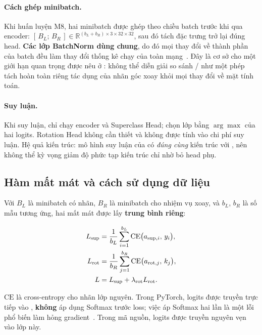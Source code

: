 \paragraph{Cách ghép minibatch.}
Khi huấn luyện M8, hai minibatch được ghép theo chiều batch trước khi qua encoder:
$[\,B_L;\, B_R\,] \in \mathbb{R}^{(b_L + b_R) \times 3 \times 32 \times 32}$, sau đó tách đặc
trưng trở lại đúng head. \textbf{Các lớp BatchNorm dùng chung}, do đó mọi thay đổi về thành phần
của batch đều làm thay đổi thống kê chạy của toàn mạng~\cite{ioffe2015batchnorm}. Đây là cơ sở
cho một giới hạn quan trọng được nêu ở : không thể diễn giải so sánh
/ như một phép tách hoàn toàn riêng tác dụng của nhãn góc xoay khỏi mọi thay
đổi về mặt tính toán.

\paragraph{Suy luận.}
Khi suy luận, chỉ chạy encoder và Superclass Head; chọn lớp bằng $\arg\max$ của hai logits.
Rotation Head không cần thiết và không được tính vào chi phí suy luận. Hệ quả kiến trúc: mô
hình suy luận của  có \emph{đúng cùng} kiến trúc với , nên không thể kỳ vọng
giảm độ phức tạp kiến trúc chỉ nhờ bỏ head phụ.

\subsection{Hàm mất mát và cách sử dụng dữ liệu}
\label{sec:loss}

Với $B_L$ là minibatch có nhãn, $B_R$ là minibatch cho nhiệm vụ xoay, và $b_L$, $b_R$ là số mẫu
tương ứng, hai mất mát được lấy \textbf{trung bình riêng}:

\begin{align}
  L_{\mathrm{sup}} &= \frac{1}{b_L}\sum_{i=1}^{b_L} \mathrm{CE}\bigl(a_{\mathrm{sup},i},\, y_i\bigr),
  \label{eq:lsup}\\
  L_{\mathrm{rot}} &= \frac{1}{b_R}\sum_{j=1}^{b_R} \mathrm{CE}\bigl(a_{\mathrm{rot},j},\, k_j\bigr),
  \label{eq:lrot}\\
  L &= L_{\mathrm{sup}} + \lambda_{\mathrm{rot}} L_{\mathrm{rot}}. \label{eq:total}
\end{align}

$\mathrm{CE}$ là cross-entropy cho nhãn lớp nguyên. Trong PyTorch, logits được truyền trực tiếp
vào , \textbf{không} áp dụng Softmax trước loss; việc áp Softmax hai lần
là một lỗi phổ biến làm hỏng gradient~\cite{pytorch_ce}. Trong mã nguồn, logits được truyền
nguyên vẹn vào lớp này.

